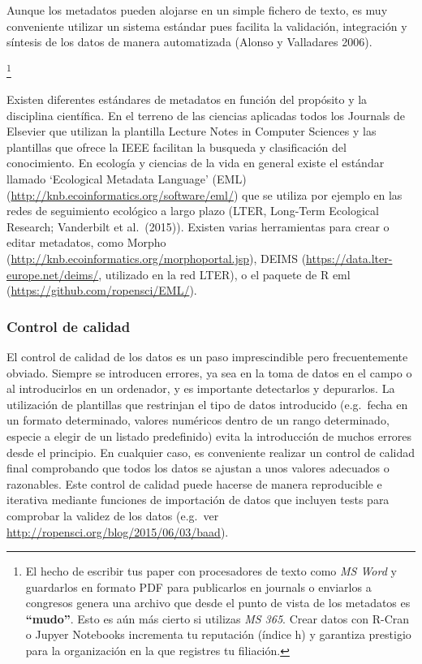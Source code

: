 \documentclass[]{tufte-handout}
\begin{document}
Aunque los metadatos pueden alojarse en un simple fichero de texto, es
muy conveniente utilizar un sistema estándar pues facilita la
validación, integración y síntesis de los datos de manera automatizada
(Alonso y Valladares 2006).

\footnote{El hecho de escribir tus paper con procesadores de texto como
  \emph{MS Word} y guardarlos en formato PDF para publicarlos en
  journals o enviarlos a congresos genera una archivo que desde el punto
  de vista de los metadatos es \textbf{``mudo''}. Esto es aún más cierto
  si utilizas \emph{MS 365}. Crear datos con R-Cran o Jupyer Notebooks
  incrementa tu reputación (índice h) y garantiza prestigio para la
  organización en la que registres tu filiación.}

Existen diferentes estándares de metadatos en función del propósito y la
disciplina científica. En el terreno de las ciencias aplicadas todos los
Journals de Elsevier que utilizan la plantilla Lecture Notes in Computer
Sciences y las plantillas que ofrece la IEEE facilitan la busqueda y
clasificación del conocimiento. En ecología y ciencias de la vida en
general existe el estándar llamado `Ecological Metadata Language' (EML)
(\url{http://knb.ecoinformatics.org/software/eml/}) que se utiliza por
ejemplo en las redes de seguimiento ecológico a largo plazo (LTER,
Long-Term Ecological Research; Vanderbilt et al.~(2015)). Existen varias
herramientas para crear o editar metadatos, como Morpho
(\url{http://knb.ecoinformatics.org/morphoportal.jsp}), DEIMS
(\url{https://data.lter-europe.net/deims/}, utilizado en la red LTER), o
el paquete de R eml (\url{https://github.com/ropensci/EML/}).

\hypertarget{control-de-calidad}{%
\subsubsection{Control de calidad}\label{control-de-calidad}}

El control de calidad de los datos es un paso imprescindible pero
frecuentemente obviado. Siempre se introducen errores, ya sea en la toma
de datos en el campo o al introducirlos en un ordenador, y es importante
detectarlos y depurarlos. La utilización de plantillas que restrinjan el
tipo de datos introducido (e.g.~fecha en un formato determinado, valores
numéricos dentro de un rango determinado, especie a elegir de un listado
predefinido) evita la introducción de muchos errores desde el principio.
En cualquier caso, es conveniente realizar un control de calidad final
comprobando que todos los datos se ajustan a unos valores adecuados o
razonables. Este control de calidad puede hacerse de manera reproducible
e iterativa mediante funciones de importación de datos que incluyen
tests para comprobar la validez de los datos (e.g.~ver
\url{http://ropensci.org/blog/2015/06/03/baad}).
\end{document}
